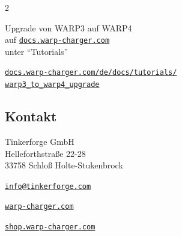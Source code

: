 \documentclass[a4paper,10pt]{article}
\begin{document}
\begin{multicols*}{2}
	\begin{tcolorbox}[colback=white, colframe=black, arc=2pt]
		\begin{center}
			{\large Upgrade von WARP3 auf WARP4}\\
			auf \href{https://docs.warp-charger.com}{\texttt{docs.warp-charger.com}}\\
			unter \enquote{Tutorials}
		\end{center}
		\vspace{1em}
		\begin{center}
		\end{center}
		\vspace{0.5em}
		\begin{center}
			\footnotesize
			\href{https://docs.warp-charger.com/de/docs/tutorials/warp3_to_warp4_upgrade}{\nolinkurl{docs.warp-charger.com/de/docs/tutorials/}\\\nolinkurl{warp3_to_warp4_upgrade}}
		\end{center}
	\end{tcolorbox}

	\subsection*{Kontakt}
	Tinkerforge GmbH\\ Helleforthstraße 22-28\\ 33758 Schloß Holte-Stukenbrock
	\begin{description}[leftmargin=!,labelwidth=\widthof{\textbf{Website}},nosep]
		\item[E-Mail] \href{mailto:info@tinkerforge.com}{\texttt{info@tinkerforge.com}}
		\item[Website] \href{https://warp-charger.com}{\texttt{warp-charger.com}}
		\item[Telefon] 
		\item[Shop] \href{https://shop.warp-charger.com}{\texttt{shop.warp-charger.com}}
	\end{description}

\end{multicols*}
\end{document}
